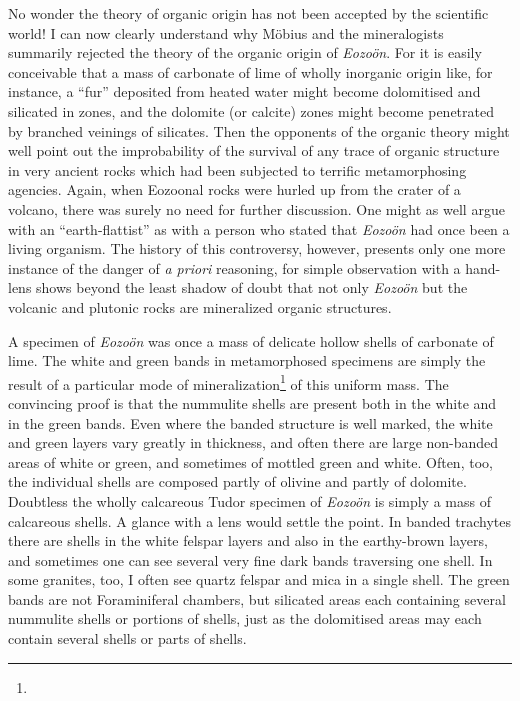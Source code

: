 \documentclass[a4paper, 12pt, oneside]{article}
\begin{document}
No wonder the theory of organic origin has not been accepted by the scientific world! I can now clearly understand why Möbius and the mineralogists summarily rejected the theory of the organic origin of \emph{Eozoön}. For it is easily conceivable that a mass of carbonate of lime of wholly inorganic origin like, for instance, a ``fur'' deposited from heated water might become dolomitised and silicated in zones, and the dolomite (or calcite) zones might become penetrated by branched veinings of silicates. Then the opponents of the organic theory might well point out the improbability of the survival of any trace of organic structure in very ancient rocks which had been subjected to terrific metamorphosing agencies. Again, when Eozoonal rocks were hurled up from the crater of a volcano, there was surely no need for further discussion. One might as well argue with an ``earth-flattist'' as with a person who stated that \emph{Eozoön} had once been a living organism. The history of this controversy, however, presents only one more instance of the danger of \emph{a priori} reasoning, for simple observation with a hand-lens shows beyond the least shadow of doubt that not only \emph{Eozoön} but the volcanic and plutonic rocks are mineralized organic structures.

A specimen of \emph{Eozoön} was once a mass of delicate hollow shells of carbonate of lime. The white and green bands in metamorphosed specimens are simply the result of a particular mode of mineralization\footnote{} of this uniform mass. The convincing proof is that the nummulite shells are present both in the white and in the green bands. Even where the banded structure is well marked, the white and green layers vary greatly in thickness, and often there are large non-banded areas of white or green, and sometimes of mottled green and white. Often, too, the individual shells are composed partly of olivine and partly of dolomite. Doubtless the wholly calcareous Tudor specimen of \emph{Eozoön} is simply a mass of calcareous shells. A glance with a lens would settle the point. In banded trachytes there are shells in the white felspar layers and also in the earthy-brown layers, and sometimes one can see several very fine dark bands traversing one shell. In some granites, too, I often see quartz felspar and mica in a single shell. The green bands are not Foraminiferal chambers, but silicated areas each containing several nummulite shells or portions of shells, just as the dolomitised areas may each contain several shells or parts of shells.
\end{document}
